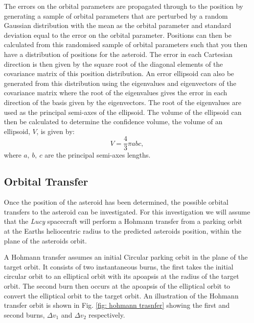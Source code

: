 \documentclass[10pt, twocolumn]{revtex4}    %
\begin{document}
The errors on the orbital parameters are propagated through to the position by generating a sample of orbital parameters that are perturbed by a random Gaussian distribution with the mean as the orbital parameter and standard deviation equal to the error on the orbital parameter. Positions can then be calculated from this randomised sample of orbital parameters such that you then have a distribution of positions for the asteroid. The error in each Cartesian direction is then given by the square root of the diagonal elements of the covariance matrix of this position distribution. An error ellipsoid can also be generated from this distribution using the eigenvalues and eigenvectors of the covariance matrix where the root of the eigenvalues gives the error in each direction of the basis given by the eigenvectors. The root of the eigenvalues are used as the principal semi-axes of the ellipsoid. The volume of the ellipsoid can then be calculated to determine the confidence volume, the volume of an ellipsoid, $V$, is given by:
\begin{equation} \label{eq: v ellipsoid}
V = \frac{4}{3}\pi a b c ,
\end{equation}
where $a,\ b,\ c$ are the principal semi-axes lengths.

\subsection*{Orbital Transfer}

Once the position of the asteroid has been determined, the possible orbital transfers to the asteroid can be investigated. For this investigation we will assume that the \textit{Lucy} spacecraft will perform a Hohmann transfer from a parking orbit at the Earths heliocentric radius to the predicted asteroids position, within the plane of the asteroids orbit. 

A Hohmann transfer assumes an initial Circular parking orbit in the plane of the target orbit. It consists of two instantaneous burns, the first takes the initial circular orbit to an elliptical orbit with its apoapsis at the radius of the target orbit. The second burn then occurs at the apoapsis of the elliptical orbit to convert the elliptical orbit to the target orbit. An illustration of the Hohmann transfer orbit is shown in Fig. \ref{fig: hohmann trasnfer} showing the first and second burns, $\Delta v_1$ and $\Delta v_2$ respectively.
\end{document}
